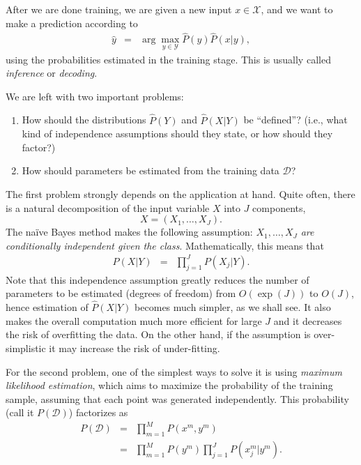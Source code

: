 After we are done training, we are given a new input $x \in \mathcal{X}$, and we want to make a prediction according to  
\begin{eqnarray}
{\hat y} &=& \arg\max_{y \in \mathcal{Y}} \hat{P}(y) \hat{P}(x|y),
\label{eq:argmax}
\end{eqnarray}
using the probabilities estimated in the training stage. This is usually called \emph{inference} or \emph{decoding}.


We are left with two important problems:
\begin{enumerate}
\item How should the distributions ${\hat P}(Y)$ and ${\hat P}(X|Y)$ be ``defined''?
(i.e., what kind of independence assumptions should they state, or how should they factor?)
\item How should parameters be estimated from the training data $\mathcal{D}$?
\end{enumerate}

The first problem strongly depends on the application at hand. Quite often, there is a natural decomposition of the input variable $X$ into $J$ components, 
\begin{equation}
X = (X_1,\ldots,X_J). 
\end{equation}
The na\"{i}ve Bayes method makes the following assumption: \emph{$X_1,\ldots,X_J$ are conditionally independent given the class}. Mathematically, this means that 
\begin{eqnarray}
P(X|Y) &=& \prod_{j=1}^J P(X_j|Y).
\end{eqnarray}
Note that this independence assumption greatly reduces the number of parameters to be estimated (degrees of freedom) 
from $O(\exp(J))$ to $O(J)$, 
hence estimation of ${\hat P}(X|Y)$ becomes much simpler, as we shall see. 
It also makes the overall computation much more efficient for large $J$ and it decreases the risk of overfitting the data. 
On the other hand, if the assumption is over-simplistic it may increase the risk 
of under-fitting. 

For the second problem, one of the simplest ways to solve it is using \emph{maximum likelihood estimation}, which aims to maximize the probability of the training sample, assuming that each point was generated independently. This probability (call it $P(\mathcal{D})$) factorizes as 
\begin{eqnarray}
P(\mathcal{D}) &=& \prod_{m=1}^M P(x^m,y^m) \nonumber\\
&=& \prod_{m=1}^M P(y^m)\prod_{j=1}^J P(x^m_j|y^m). 
\end{eqnarray}



